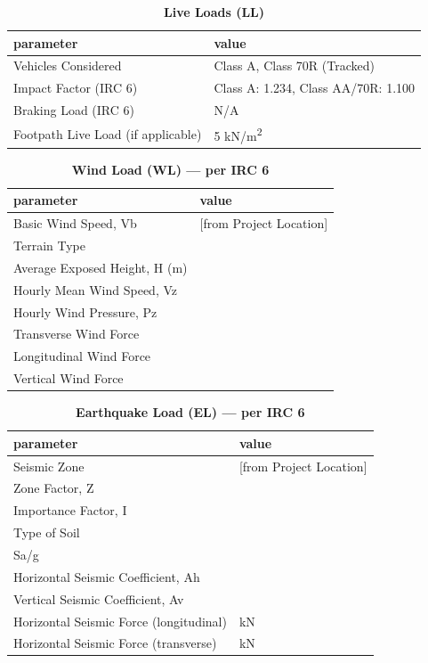 \documentclass[12pt,a4paper]{report}
\numberwithin{table}{chapter}
\numberwithin{figure}{chapter}
\begin{document}
\vspace{1em}
\begin{longtable}{|L{5.5cm}|p{10.0cm}|}
\caption{\textbf{Live Loads (LL)}}
\hline
\textbf{parameter} & \textbf{value} \\
\hline
\textnormal{Vehicles Considered} & Class A, Class 70R (Tracked) \\[6pt]
\hline
\textnormal{Impact Factor (IRC 6)} & Class A:\allowbreak{} 1.234, Class AA/70R:\allowbreak{} 1.100 \\[6pt]
\hline
\textnormal{Braking Load (IRC 6)} & N/A \\[6pt]
\hline
\textnormal{Footpath Live Load (if applicable)} & 5 kN/m\textsuperscript{2} \\[6pt]
\hline
\end{longtable}

\vspace{1em}
\begin{longtable}{|L{5.5cm}|p{10.0cm}|}
\caption{\textbf{Wind Load (WL) --- per IRC 6}}
\hline
\textbf{parameter} & \textbf{value} \\
\hline
\textnormal{Basic Wind Speed, Vb} &  [from Project Location] \\[6pt]
\hline
\textnormal{Terrain Type} &  \\[6pt]
\hline
\textnormal{Average Exposed Height, H (m)} &  \\[6pt]
\hline
\textnormal{Hourly Mean Wind Speed, Vz} &  \\[6pt]
\hline
\textnormal{Hourly Wind Pressure, Pz} &  \\[6pt]
\hline
\textnormal{Transverse Wind Force} &  \\[6pt]
\hline
\textnormal{Longitudinal Wind Force} &  \\[6pt]
\hline
\textnormal{Vertical Wind Force} &  \\[6pt]
\hline
\end{longtable}

\vspace{1em}
\begin{longtable}{|L{5.5cm}|p{10.0cm}|}
\caption{\textbf{Earthquake Load (EL) --- per IRC 6}}
\hline
\textbf{parameter} & \textbf{value} \\
\hline
\textnormal{Seismic Zone} &  [from Project Location] \\[6pt]
\hline
\textnormal{Zone Factor, Z} &  \\[6pt]
\hline
\textnormal{Importance Factor, I} &  \\[6pt]
\hline
\textnormal{Type of Soil} &  \\[6pt]
\hline
\textnormal{Sa/g} &  \\[6pt]
\hline
\textnormal{Horizontal Seismic Coefficient, Ah} &  \\[6pt]
\hline
\textnormal{Vertical Seismic Coefficient, Av} &  \\[6pt]
\hline
\textnormal{Horizontal Seismic Force (longitudinal)} &  kN \\[6pt]
\hline
\textnormal{Horizontal Seismic Force (transverse)} &  kN \\[6pt]
\hline
\end{longtable}
\end{document}
